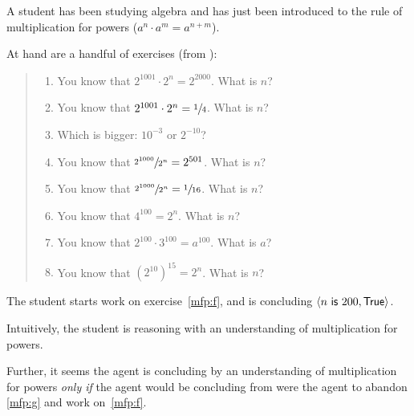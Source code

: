 \begin{note}
  \begin{scenario}%
    \label{illu:tR:powers}%
    A student has been studying algebra and has just been introduced to the rule of multiplication for powers (\(a^{n} \cdot a^{m} = a^{n + m}\)).

    At hand are a handful of exercises (from \cite[32]{Gelfand:1993aa}):
    \begin{quote}
      \begin{enumerate}[label=(\alph*), ref=(\alph*)]
      \item
        \label{mfp:a}
        You know that \(2^{1001} \cdot 2^{n} = 2^{2000}\).
        What is \(n\)?
      \item
        \label{mfp:b}
        You know that \(2^{1001} \cdot 2^{n} = \sfrac{1}{4}\).
        What is \(n\)?
      \item
        \label{mfp:c}
        Which is bigger: \(10^{-3}\) or \(2^{-10}\)?
      \item
        \label{mfp:d}
        You know that \(\sfrac{2^{1000}}{2^{n}} = 2^{501}\).
        What is \(n\)?
      \item
        \label{mfp:e}
        You know that \(\sfrac{2^{1000}}{2^{n}} = \sfrac{1}{16}\).
        What is \(n\)?
      \item
        \label{mfp:f}
        You know that \(4^{100} = 2^{n}\).
        What is \(n\)?
      \item
        \label{mfp:g}
        You know that \(2^{100} \cdot 3^{100} = a^{100}\).
        What is \(a\)?
      \item
        \label{mfp:h}
        You know that \((2^{10})^{15} = 2^{n}\).
        What is \(n\)?
      \end{enumerate}
    \end{quote}
    The student starts work on exercise~\ref{mfp:f}, and is concluding \(\pv{n\propI{ is }200}{\valI{True}}\).
  \end{scenario}

  \noindent%
  Intuitively, the student is reasoning with an understanding of multiplication for powers.

  Further, it seems the agent is concluding  by an understanding of multiplication for powers \emph{only if} the agent would be concluding  from  were the agent to abandon \ref{mfp:g} and work on~\ref{mfp:f}.


\end{note}
